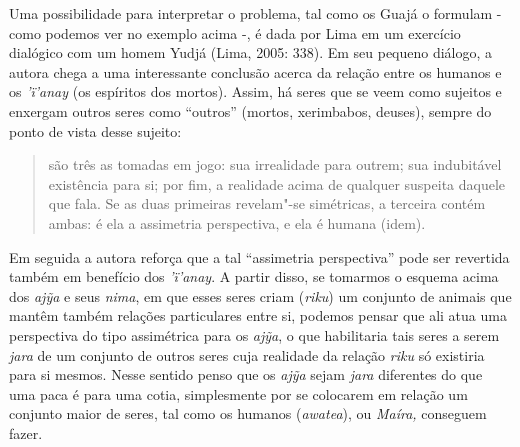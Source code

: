 Uma possibilidade para interpretar o problema, tal como os Guajá o
formulam - como podemos ver no exemplo acima -, é dada por Lima em um
exercício dialógico com um homem Yudjá (Lima, 2005: 338). Em seu pequeno
diálogo, a autora chega a uma interessante conclusão acerca da relação
entre os humanos e os \emph{'ï'anay} (os espíritos dos mortos). Assim,
há seres que se veem como sujeitos e enxergam outros seres como ``outros''
(mortos, xerimbabos, deuses), sempre do ponto de vista desse sujeito:

\begin{quote}
são três as tomadas em jogo: sua irrealidade para outrem; sua
indubitável existência para si; por fim, a realidade acima de qualquer
suspeita daquele que fala. Se as duas primeiras revelam"-se simétricas, a
terceira contém ambas: é ela a assimetria perspectiva, e ela é humana
(idem).
\end{quote}

Em seguida a autora reforça que a tal ``assimetria perspectiva'' pode ser
revertida também em benefício dos \emph{'ï'anay}. A partir disso, se
tomarmos o esquema acima dos \emph{ajỹa} e seus \emph{nima}, em que
esses seres criam (\emph{riku}) um conjunto de animais que mantêm também
relações particulares entre si, podemos pensar que ali atua uma
perspectiva do tipo assimétrica para os \emph{ajỹa}, o que habilitaria
tais seres a serem \emph{jara} de um conjunto de outros seres cuja
realidade da relação \emph{riku} só existiria para si mesmos. Nesse
sentido penso que os \emph{ajỹa} sejam \emph{jara} diferentes do que uma
paca é para uma cotia, simplesmente por se colocarem em relação um
conjunto maior de seres, tal como os humanos (\emph{awatea}), ou
\emph{Maíra,} conseguem fazer.

